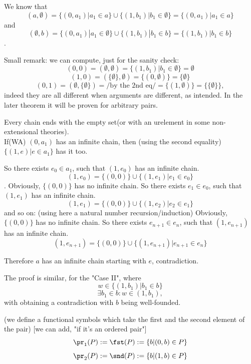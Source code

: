 
We know that
\[
(a,\emptyset) = \{(0,a_1)|a_1\in a\}\cup \{(1,b_1)|b_1\in \emptyset\} = \{(0,a_1)|a_1\in a\}
\]
and
\[
(\emptyset,b) = \{(0,a_1)|a_1\in \emptyset\}\cup \{(1,b_1)|b_1\in b\} = \{(1,b_1)|b_1\in b\}
\]
.

Small remark: we can compute, just for the sanity check:
\[
(0,0) = (\emptyset,\emptyset) = \{(1,b_1)|b_1\in \emptyset\} = \emptyset
\]
\[
(1,0) = (\{\emptyset\},\emptyset) = \{(0,\emptyset)\} = \{\emptyset\}
\]
\[
(0,1) = (\emptyset,\{\emptyset\}) =/\mbox{by the 2nd eq}/= \{(1,\emptyset)\} = \{\{\emptyset\}\},
\]
indeed they are all different when arguments are different, as intended. In the later theorem it will be proven for arbitrary pairs.

Every chain ends with the empty set(or with an urelement in some non-extensional theories).\\

If(WA) $(0,a_1)$ has an infinite chain, then (using the second equality) 
$\{(1,e)|e\in a_1\}$ has it too. 

So there exists $e_0\in a_1$, such that $(1,e_0)$ has an infinite chain.
\[
(1,e_0) = \{(0,0)\}\cup \{(1,e_1)|e_1\in e_0\}
\]
.
Obviously, $\{(0,0)\}$ has no infinite chain. So there exists $e_1\in e_0$, such that $(1,e_1)$ has an infinite chain.
\[
(1,e_1) = \{(0,0)\}\cup \{(1,e_2)|e_2\in e_1\}
\]
and so on: (using here a natural number recursion/induction)
Obviously, $\{(0,0)\}$ has no infinite chain. So there exists $e_{n+1}\in e_{n}$, such that $(1,e_{n+1})$ has an infinite chain.
\[
(1,e_{n+1}) = \{(0,0)\}\cup \{(1,e_{n+1})|e_{n+1}\in e_n\}
\]

Therefore $a$ has an infinite chain starting with $e$, contradiction.

The proof is similar, for the "Case II", where
\[
w\in \{(1,b_1)|b_1\in b\}
\]
\[
\exists b_1\in b: w\in (1,b_1),
\]
with obtaining a contradiction with $b$ being well-founded.\\
\Done

\begin{definition}(we define a functional symbols which take the first and the second element of the pair) [we can add, "if it's an ordered pair"]
\[
\pr_1(P) := \fst(P) := \{b|(0,b)\in P\}
\]
\[
\pr_2(P) := \snd(P) := \{b|(1,b)\in P\}
\]
\end{definition}

